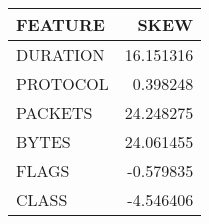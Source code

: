 \begin{tabular}{lr}
\toprule
 FEATURE &      SKEW \\
\midrule
DURATION & 16.151316 \\
PROTOCOL &  0.398248 \\
 PACKETS & 24.248275 \\
   BYTES & 24.061455 \\
   FLAGS & -0.579835 \\
   CLASS & -4.546406 \\
\bottomrule
\end{tabular}
